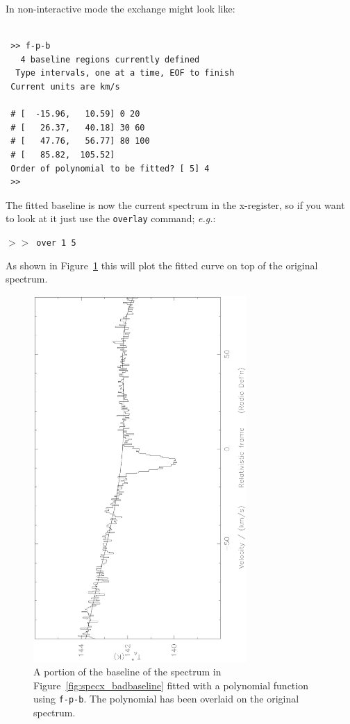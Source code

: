 \documentclass[11pt,twoside]{article}
\newcommand{\eg}{{\it e.g.}}
\newcommand{\SP}{{$>\!>$}}
\begin{document}
In non-interactive mode the exchange might look like:
\begin{verbatim}

 >> f-p-b
   4 baseline regions currently defined
  Type intervals, one at a time, EOF to finish
 Current units are km/s

 # [  -15.96,   10.59] 0 20
 # [   26.37,   40.18] 30 60
 # [   47.76,   56.77] 80 100
 # [   85.82,  105.52]
 Order of polynomial to be fitted? [ 5] 4
 >>
\end{verbatim}

The fitted baseline is now the current spectrum in the x-register, so if
you want to
look at it just use the {\tt overlay} command; \eg :

\SP\ \verb|over 1 5|

As shown in Figure~\ref{fig:specx_fpb} this will plot the fitted curve
on top of the original spectrum.

\begin{figure}[htb]
\centering
\includegraphics[angle=-90,width=3.2in]{sc8_fpb.ps}
\vspace*{-0.5cm}
\begin{center}
\begin{minipage}[t]{5in}
\caption[A polynomial baseline fit]
{\small{A portion of the baseline of the spectrum in
Figure~\ref{fig:specx_badbaseline} fitted with a polynomial function
using {\tt f-p-b}. The polynomial has been overlaid on the original
spectrum.  }}
\label{fig:specx_fpb}
\end{minipage}
\end{center}
\end{figure}
\end{document}
